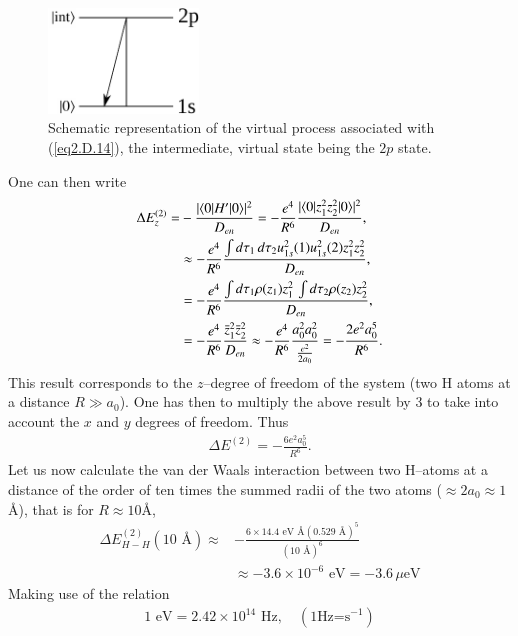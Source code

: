 \begin{subappendices}
        \begin{figure}[h]
         \centerline{\includegraphics*[width=4cm,angle=0]{nutshell/figs/fig2D5_v2.pdf}}
         \caption{Schematic representation of the virtual process associated with (\ref{eq2.D.14}), the intermediate, virtual state being the $2p$ state.}\label{fig2.D.5}
         \end{figure}
  One can then write
  \begin{align}\label{eq2.D.17}
  \nonumber \Delta E_z^{(2)}=&-\frac{|\langle {0|H'|0} \rangle|^2}{D_{en}}=-\frac{e^4}{R^6}\frac{|\langle {0|z_1^2z_2^2|0} \rangle|^2}{D_{en}},\\
\nonumber  &\approx-\frac{e^4}{R^6}\frac{\int d\tau_1\,d\tau_2u^2_{1s}(1)u^2_{1s}(2)z_1^2z_2^2}{D_{en}},\\
\nonumber  &=-\frac{e^4}{R^6}\frac{\int d\tau_1\rho(z_1)z_1^2\,\int d\tau_2\rho(z_2)z_2^2}{D_{en}},\\
&=-\frac{e^4}{R^6}\frac{\bar z_1^2 \bar z_2^2}{D_{en}}\approx-\frac{e^4}{R^6}\frac{a_0^2a_0^2}{\frac{e^2}{2a_0}}=-\frac{2e^2a_0^5}{R^6}.  
   \end{align} 
This result corresponds to the $z$--degree of freedom of the system (two H atoms at a distance $R\gg a_0$). One has then to multiply the above result by 3 to take into account the $x$ and $y$ degrees of freedom. Thus   
   \begin{align}\label{eq2.D.18}
\Delta E^{(2)}=-\frac{6e^2a_0^5}{R^6}.
 \end{align}
Let us now calculate the van der Waals interaction between two H--atoms at a distance of the order of ten times the summed radii of the two atoms ($\approx2a_0\approx1$\AA), that is for $R\approx10$\AA, 
  \begin{align}\label{eq2.D.19}
  \nonumber \Delta E_{H-H}^{(2)}(10\text{ \AA})\approx&-\frac{6\times14.4\text{ eV \AA}(0.529\text{ \AA})^5}{(10\text{ \AA})^6}\\
  &\approx-3.6\times10^{-6}\text{ eV}=-3.6\,\mu\text{eV}  
   \end{align}  
Making use of the relation
\begin{align}\label{eq2.D.20}
1\text{ eV}=2.42\times 10^{14}\text{ Hz},\quad(1\text{Hz=s}^{-1})  
   \end{align}  

\end{subappendices}
